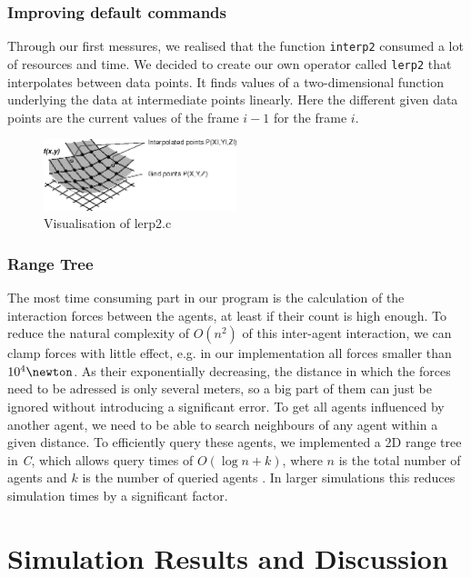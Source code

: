 \documentclass[11pt]{article}
\begin{document}
\subsubsection{Improving default commands}

Through our first messures, we realised that the function \verb+interp2+ consumed a lot of resources and time. We decided to create our own operator called \verb+lerp2+ that interpolates between data points. It finds values of a two-dimensional function  underlying the data at intermediate points linearly. Here the different given data points are the current values of the frame $i-1$ for the frame $i$. 

\begin{figure}[h]
\centering
\includegraphics[width=0.5\textwidth]{./images/lerp2.png}
\caption{Visualisation of lerp2.c} 
\label{lerp2 image}
\end{figure}

\subsubsection{Range Tree}
The most time consuming part in our program is the calculation of the interaction forces between the agents, at least if their count is high enough. To reduce the natural complexity of $O(n^{2})$ of this inter-agent interaction, we can clamp forces with little effect, e.g. in our implementation all forces smaller than $ 10^{4}\newton$. As their exponentially decreasing, the distance in which the forces need to be adressed is only several meters, so a big part of them can just be ignored without introducing a significant error.
To get all agents influenced by another agent, we need to be able to search neighbours of any agent within a given distance. To efficiently query these agents, we implemented a 2D range tree in \textit{C}, which allows query times of $O(\log n+k)$, where $n$ is the total number of agents and $k$ is the number of queried agents \cite{algdat}. In larger simulations this reduces simulation times by a significant factor.




\section{Simulation Results and Discussion}
\end{document}
